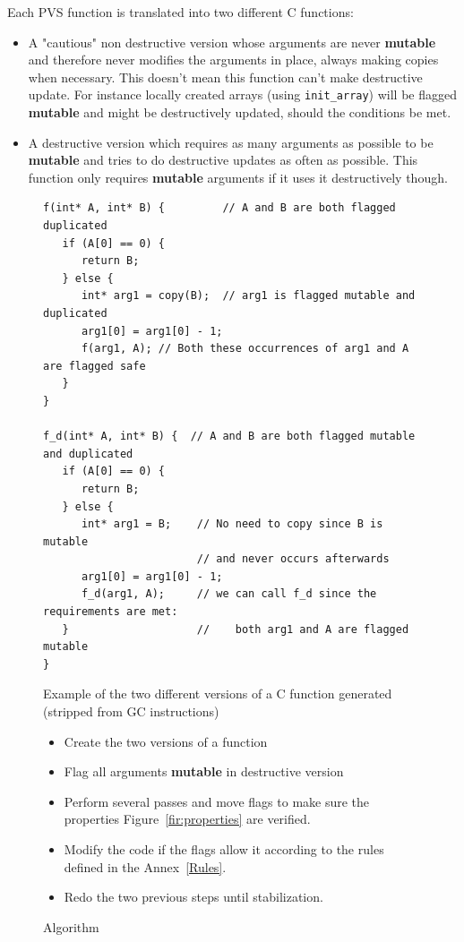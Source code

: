 \documentclass[12pt,a4paper,titlepage]{article}
\newcommand{\cl}[1]{\texttt{#1}}
\newcommand{\bang}{ \textbf{ mutable } }
\begin{document}
Each PVS function is translated into two different C functions:
\begin{itemize}
\item A "cautious" non destructive version whose arguments are never \bang and therefore never modifies the arguments in place, always making copies when necessary. This doesn't mean this function can't make destructive update. For instance locally created arrays (using \cl{init\_array}) will be flagged \bang and might be destructively updated, should the conditions be met.
\item A destructive version which requires as many arguments as possible to be \bang and tries to do destructive updates as often as possible. This function only requires \bang arguments if it uses it destructively though.
\end{itemize}


\begin{figure}
\begin{lstlisting}
f(int* A, int* B) {         // A and B are both flagged duplicated
   if (A[0] == 0) {
      return B;
   } else {
      int* arg1 = copy(B);  // arg1 is flagged mutable and duplicated
      arg1[0] = arg1[0] - 1;
      f(arg1, A); // Both these occurrences of arg1 and A are flagged safe
   }
}

f_d(int* A, int* B) {  // A and B are both flagged mutable and duplicated
   if (A[0] == 0) {
      return B;
   } else {
      int* arg1 = B;    // No need to copy since B is mutable
                        // and never occurs afterwards
      arg1[0] = arg1[0] - 1;
      f_d(arg1, A);     // we can call f_d since the requirements are met:
   }                    //    both arg1 and A are flagged mutable
}
\end{lstlisting}
\caption{Example of the two different versions of a C function generated (stripped from GC instructions)}
\end{figure}




\begin{figure}
\begin{itemize}
\item Create the two versions of a function
\item Flag all arguments \bang in destructive version
\item Perform several passes and move flags to make sure the properties Figure~\ref{fir:properties} are verified.
\item Modify the code if the flags allow it according to the rules defined in the Annex~\ref{Rules}.
\item Redo the two previous steps until stabilization.
\end{itemize}
\caption{Algorithm}
\end{figure}
\end{document}
